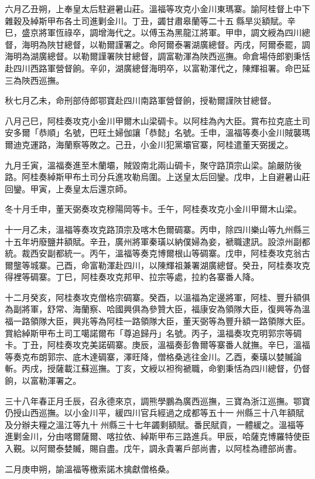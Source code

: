 \begin{pinyinscope}
六月乙丑朔，上奉皇太后駐避暑山莊。溫福等攻克小金川東瑪寨。諭阿桂督上中下雜穀及綽斯甲布各土司進剿金川。丁丑，蠲甘肅皋蘭等二十五縣旱災額賦。辛巳，盛京將軍恆祿卒，調增海代之。以傅玉為黑龍江將軍。甲申，調文綬為四川總督，海明為陜甘總督，以勒爾謹署之。命阿爾泰署湖廣總督。丙戌，阿爾泰罷，調海明為湖廣總督。以勒爾謹署陜甘總督，調富勒渾為陜西巡撫。命倉場侍郎劉秉恬赴四川西路軍營督餉。辛卯，湖廣總督海明卒，以富勒渾代之，陳輝祖署。命巴延三為陜西巡撫。

秋七月乙未，命刑部侍郎鄂寶赴四川南路軍營督餉，授勒爾謹陜甘總督。

八月己巳，阿桂奏攻克小金川甲爾木山梁碉卡。以阿桂為內大臣。賞布拉克底土司安多爾「恭順」名號，巴旺土婦伽讓「恭懿」名號。壬申，溫福等奏小金川賊襲瑪爾迪克運路，海蘭察等敗之。己丑，小金川犯黨壩官寨，阿桂遣董天弼援之。

九月壬寅，溫福奏進至木蘭壩，賊毀南北兩山碉卡，聚守路頂宗山梁。諭嚴防後路。阿桂奏綽斯甲布土司分兵進攻勒烏圍。上送皇太后回鑾。戊申，上自避暑山莊回鑾。甲寅，上奏皇太后還京師。

冬十月壬申，董天弼奏攻克穆陽岡等卡。壬午，阿桂奏攻克小金川甲爾木山梁。

十一月乙未，溫福等奏攻克路頂宗及喀木色爾碉寨。丙申，除四川樂山等九州縣三十五年坍廢鹽井額賦。辛丑，廣州將軍秦璜以納僕婦為妾，褫職逮訊。設涼州副都統。裁西安副都統一。丙午，溫福等奏克博爾根山等碉寨。戊申，阿桂奏攻克翁古爾壟等城寨。己酉，命富勒渾赴四川，以陳輝祖兼署湖廣總督。癸丑，阿桂奏攻克得裡等碉寨。丁巳，阿桂奏攻克邦甲、拉宗等處，拉約各寨番人降。

十二月癸亥，阿桂奏攻克僧格宗碉寨。癸酉，以溫福為定邊將軍，阿桂、豐升額俱為副將軍，舒常、海蘭察、哈國興俱為參贊大臣，福康安為領隊大臣，復興等為溫福一路領隊大臣，興兆等為阿桂一路領隊大臣，董天弼等為豐升額一路領隊大臣。賞給綽斯甲布土司工噶諾爾布「尊追歸丹」名號。丙子，溫福奏攻克明郭宗等碉卡。丁丑，阿桂奏攻克美諾碉寨。庚辰，溫福奏彭魯爾等寨番人就撫。辛巳，溫福等奏克布朗郭宗、底木達碉寨，澤旺降，僧格桑逃往金川。乙酉，秦璜以婪贓論斬。丙戌，授薩載江蘇巡撫。丁亥，文綬以袒徇褫職，命劉秉恬為四川總督，仍督餉，以富勒渾署之。

三十八年春正月壬辰，召永德來京，調熊學鵬為廣西巡撫，三寶為浙江巡撫。鄂寶仍授山西巡撫。以小金川平，緩四川官兵經過之成都等五十一州縣三十八年額賦及分辦夫糧之溫江等九十州縣三十七年蠲剩額賦。番民賦貢，一體緩之。溫福等進剿金川，分由喀爾薩爾、喀拉依、綽斯甲布三路進兵。甲辰，哈薩克博羅特使臣入覲。以阿爾泰婪贓，賜自盡。戊午，調永貴署戶部尚書，以阿桂為禮部尚書。

二月庚申朔，諭溫福等檄索諾木擒獻僧格桑。


\end{pinyinscope}
